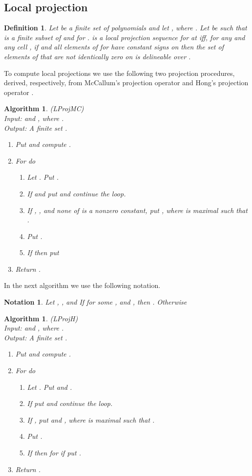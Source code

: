 \documentclass[english]{amsart}
\numberwithin{equation}{section}
\numberwithin{figure}{section}
\newtheorem{defn}[thm]{Definition}
\newtheorem{notation}[thm]{Notation}
\newtheorem{algorithm}[thm]{Algorithm}
\begin{document}
\subsection{Local projection}
\begin{defn}
Let  be a finite set of
polynomials and let ,
where . Let  be such that 
is a finite subset of  and 
for .  is a \emph{local projection sequence} for
 at  iff, for any  and any cell ,
if  and all elements of  for 
have constant signs on  then the set of elements of 
that are not identically zero on  is delineable
over . 
\end{defn}
To compute local projections we use the following two projection procedures,
derived, respectively, from McCallum's projection operator \cite{MC1,MC2,B}
and Hong's projection operator \cite{H}.
\begin{algorithm}
\label{alg:LProjMC}(LProjMC)\\
Input:\emph{ } \emph{and
}\emph{, where
.}\textup{}\\
\textup{\emph{Output:}}\textup{ A }\emph{finite set }.
\begin{enumerate}
\item Put  and compute .
\item For  do

\begin{enumerate}
\item Let . Put .
\item If  and 
put 
 and continue the loop.
\item If , , and none of 
is a nonzero constant, put , where  is maximal
such that .
\item Put .
\item If  then put 

\end{enumerate}
\item Return .
\end{enumerate}
\end{algorithm}
In the next algorithm we use the following notation.
\begin{notation}
Let , ,
and 
If for some , 
and , then .
Otherwise 
\end{notation}
\begin{algorithm}
\label{alg:LProjH}(LProjH)\\
Input:\emph{ } \emph{and
}\emph{, where
.}\textup{}\\
\textup{\emph{Output:}}\textup{ A }\emph{finite set }. 
\begin{enumerate}
\item Put  and compute .
\item For  do

\begin{enumerate}
\item Let . Put 
and .
\item If  put 
and continue the loop.
\item If , put 
and , where  is maximal
such that .
\item Put .
\item If  then for  if  put .
\end{enumerate}
\item Return .
\end{enumerate}
\end{algorithm}
\end{document}
